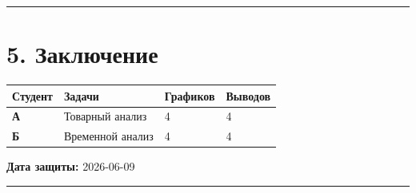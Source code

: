 \documentclass[
]{article}
\begin{document}
\begin{center}\rule{0.5\linewidth}{0.5pt}\end{center}

\section{5.
Заключение}\label{ux437ux430ux43aux43bux44eux447ux435ux43dux438ux435}

\begin{longtable}[]{@{}llll@{}}
\toprule\noalign{}
Студент & Задачи & Графиков & Выводов \\
\midrule\noalign{}
\endhead
\bottomrule\noalign{}
\endlastfoot
\textbf{А} & Товарный анализ & 4 & 4 \\
\textbf{Б} & Временной анализ & 4 & 4 \\
\end{longtable}

\textbf{Дата защиты:} 2026-06-09

\begin{center}\rule{0.5\linewidth}{0.5pt}\end{center}
\end{document}
